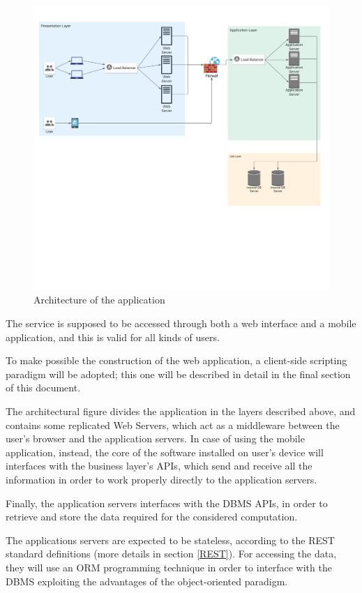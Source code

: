 \documentclass[table, 12pt]{article}
\begin{document}
\begin{figure}[H]
    \includegraphics[width=\textwidth]{assets/Architectural-Design/ApplicationArchitecture.png}
    \caption{Architecture of the application}\label{three_tier_application}
\end{figure}

The service is supposed to be accessed through both a web interface and a mobile application, and this is valid for all kinds of users.

To make possible the construction of the web application, a client-side scripting paradigm will be adopted; this one will be described in detail in the final section of this document.

The architectural figure divides the application in the layers described above, and contains some replicated Web Servers, which act as a middleware between the user's browser and the application servers.
In case of using the mobile application, instead, the core of the software installed on user's device will interfaces with the business layer's APIs, which send and receive all the information in order to work properly directly to the application servers.

Finally, the application servers interfaces with the DBMS APIs, in order to retrieve and store the data required for the considered computation.

The applications servers are expected to be stateless, according to the REST standard definitions (more details in section \ref{REST}).
For accessing the data, they will use an ORM programming technique in order to interface with the DBMS exploiting the advantages of the object-oriented paradigm.
\end{document}
